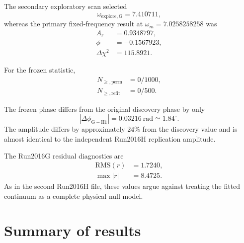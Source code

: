 \documentclass[11pt]{article}
\begin{document}
The secondary exploratory scan selected
\begin{equation}
\omega_{\mathrm{explore,G}}=7.410711,
\end{equation}
whereas the primary fixed-frequency result at
\(\omega_m=7.0258258258\) was
\begin{align}
A_r &= 0.9348797,\\
\phi &= -0.1567923,\\
\Delta\chi^2 &= 115.8921.
\end{align}

For the frozen statistic,
\begin{align}
N_{\ge,\mathrm{perm}}&=0/1000,\\
N_{\ge,\mathrm{refit}}&=0/500.
\end{align}

The frozen phase differs from the original discovery phase by only
\begin{equation}
|\Delta\phi_{\mathrm{G-H1}}|
=
0.03216~\mathrm{rad}
\simeq1.84^\circ.
\end{equation}
The amplitude differs by approximately \(24\%\) from the discovery value and
is almost identical to the independent Run2016H replication amplitude.

The Run2016G residual diagnostics are
\begin{align}
\mathrm{RMS}(r)&=1.7240,\\
\max|r|&=8.4725.
\end{align}
As in the second Run2016H file, these values argue against treating the fitted
continuum as a complete physical null model.

\section{Summary of results}
\end{document}
